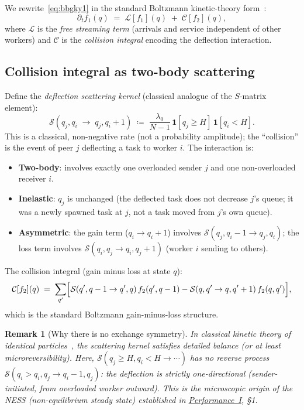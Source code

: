 \documentclass[11pt,a4paper]{article}
\newtheorem{remark}{Remark}[section]
\newcommand{\fone}{f_1}
\newcommand{\ftwo}{f_2}
\newcommand{\cC}{\mathcal{C}}
\newcommand{\cL}{\mathcal{L}}
\newcommand{\cS}{\mathcal{S}}
\begin{document}
We rewrite~\eqref{eq:bbgky1} in the standard Boltzmann kinetic-theory form~\cite{boltzmann1872,cercignani1988}:
\begin{equation}
  \partial_t \fone(q) \;=\; \cL[\fone](q) \;+\; \cC[\ftwo](q),
  \label{eq:boltzmann}
\end{equation}
where $\cL$ is the \emph{free streaming term} (arrivals and service independent
of other workers) and $\cC$ is the \emph{collision integral} encoding the
deflection interaction.

\subsection{Collision integral as two-body scattering}

Define the \emph{deflection scattering kernel}
(classical analogue of the $S$-matrix element):
\begin{equation}
  \cS(q_j, q_i \;\to\; q_j, q_i + 1)
  \;\coloneqq\;
  \frac{\lambda_0}{N-1}\,
  \mathbf{1}[q_j \geq H]\,\mathbf{1}[q_i < H].
  \label{eq:smatrix}
\end{equation}
This is a classical, non-negative rate (not a probability amplitude);
the ``collision'' is the event of peer $j$ deflecting a task to worker $i$.
The interaction is:
\begin{itemize}
  \item \textbf{Two-body}: involves exactly one overloaded sender $j$ and
        one non-overloaded receiver $i$.
  \item \textbf{Inelastic}: $q_j$ is unchanged (the deflected task does not
        decrease $j$'s queue; it was a newly spawned task at $j$,
        not a task moved from $j$'s own queue).
  \item \textbf{Asymmetric}: the gain term ($q_i \to q_i+1$) involves
        $\cS(q_j, q_i-1 \to q_j, q_i)$; the loss term involves
        $\cS(q_i, q_j \to q_i, q_j+1)$ (worker $i$ sending to others).
\end{itemize}

The collision integral (gain minus loss at state $q$):
\begin{equation}
  \cC[\ftwo](q)
  \;=\;
  \sum_{q'}\Bigl[
    \cS(q', q-1 \to q', q)\,\ftwo(q', q-1)
    -
    \cS(q, q' \to q, q'+1)\,\ftwo(q, q')
  \Bigr],
  \label{eq:collision}
\end{equation}
which is the standard Boltzmann gain-minus-loss structure.

\begin{remark}[Why there is no exchange symmetry]
In classical kinetic theory of identical particles~\cite{cercignani1988}, the scattering kernel
satisfies detailed balance (or at least microreversibility).
Here, $\cS(q_j \geq H, q_i < H \to \cdots)$ has \emph{no} reverse
process $\cS(q_i > q_i, q_j \to q_i - 1, q_j)$: the deflection is
strictly one-directional (sender-initiated, from overloaded worker outward).
This is the microscopic origin of the NESS (non-equilibrium steady state)
established in \hyperref[chap:load_balance]{Performance~I}, \S{}1.
\end{remark}
\end{document}
